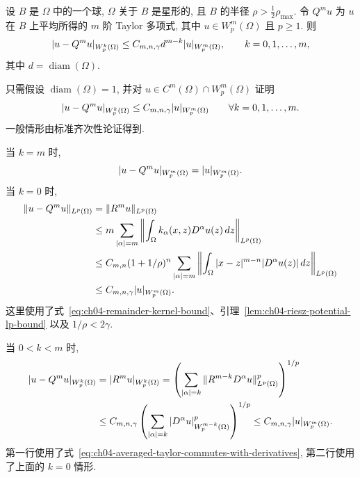 \setcounter{thmcount}{7}
\begin{Lemma}
\label{lem:ch04-bramble-hilbert}
设 $B$ 是 $\Omega$ 中的一个球, $\Omega$ 关于 $B$ 是星形的, 且 $B$ 的半径 $\rho>\frac12\rho_{\max}$. 令 $Q^m u$ 为 $u$ 在 $B$ 上平均所得的 $m$ 阶 Taylor 多项式, 其中 $u\in W_p^m(\Omega)$ 且 $p\geq1$. 则
\begin{equation}
\MathBookFormulaID{formula-ch04-bramble-hilbert-estimate}
\label{eq:ch04-bramble-hilbert-estimate}
|u-Q^m u|_{W_p^k(\Omega)}
\leq C_{m,n,\gamma}d^{m-k}|u|_{W_p^m(\Omega)},
\qquad k=0,1,\ldots,m,
\end{equation}
其中 $d=\operatorname{diam}(\Omega)$.
\end{Lemma}
\begin{Proof}
只需假设 $\operatorname{diam}(\Omega)=1$, 并对 $u\in C^m(\Omega)\cap W_p^m(\Omega)$ 证明
\begin{equation}
\MathBookFormulaID{formula-ch04-bramble-hilbert-normalized}
\label{eq:ch04-bramble-hilbert-normalized}
|u-Q^m u|_{W_p^k(\Omega)}
\leq C_{m,n,\gamma}|u|_{W_p^m(\Omega)}
\qquad\forall k=0,1,\ldots,m.
\end{equation}
一般情形由标准齐次性论证得到.

当 $k=m$ 时,
\[
\MathBookFormulaID{formula-ch04-bramble-hilbert-k-equals-m}
|u-Q^m u|_{W_p^m(\Omega)}=|u|_{W_p^m(\Omega)}.
\]
当 $k=0$ 时,
\[
\MathBookFormulaID{formula-ch04-bramble-hilbert-k-zero}
\begin{aligned}
\|u-Q^m u\|_{L^p(\Omega)}
&=\|R^m u\|_{L^p(\Omega)}\\
&\leq m\sum_{|\alpha|=m}\left\|\int_\Omega k_\alpha(x,z)D^\alpha u(z)\,dz\right\|_{L^p(\Omega)}\\
&\leq C_{m,n}(1+1/\rho)^n\sum_{|\alpha|=m}
\left\|\int_\Omega|x-z|^{m-n}|D^\alpha u(z)|\,dz\right\|_{L^p(\Omega)}\\
&\leq C_{m,n,\gamma}|u|_{W_p^m(\Omega)}.
\end{aligned}
\]
这里使用了式~\eqref{eq:ch04-remainder-kernel-bound}、引理~\ref{lem:ch04-riesz-potential-lp-bound} 以及 $1/\rho<2\gamma$.

当 $0<k<m$ 时,
\[
\MathBookFormulaID{formula-ch04-bramble-hilbert-intermediate-k}
\begin{aligned}
|u-Q^m u|_{W_p^k(\Omega)}
&=|R^m u|_{W_p^k(\Omega)}
=\left(\sum_{|\alpha|=k}\|R^{m-k}D^\alpha u\|_{L^p(\Omega)}^p\right)^{1/p}\\
&\leq C_{m,n,\gamma}
\left(\sum_{|\alpha|=k}|D^\alpha u|_{W_p^{m-k}(\Omega)}^p\right)^{1/p}
\leq C_{m,n,\gamma}|u|_{W_p^m(\Omega)}.
\end{aligned}
\]
第一行使用了式~\eqref{eq:ch04-averaged-taylor-commutes-with-derivatives}, 第二行使用了上面的 $k=0$ 情形.


\end{Proof}
